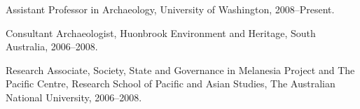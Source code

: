 
\ind Assistant Professor in Archaeology,  University of Washington, 2008--Present.     

\ind Consultant Archaeologist, Huonbrook Environment and Heritage, South Australia, 2006--2008.

\ind Research Associate, Society, State and Governance in Melanesia Project and The Pacific Centre, Research School of Pacific and Asian Studies, The Australian National University, 2006--2008.
